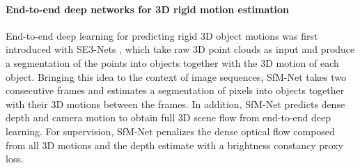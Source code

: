 \paragraph{End-to-end deep networks for 3D rigid motion estimation}
End-to-end deep learning for predicting rigid 3D object motions was first introduced with
SE3-Nets \cite{SE3Nets}, which take raw 3D point clouds as input and produce a segmentation
of the points into objects together with the 3D motion of each object.
Bringing this idea to the context of image sequences, SfM-Net \cite{SfmNet} takes two consecutive frames and
estimates a segmentation of pixels into objects together with their 3D motions between the frames.
In addition, SfM-Net predicts dense depth and camera motion to obtain full 3D scene flow from end-to-end deep learning.
For supervision, SfM-Net penalizes the dense optical flow composed from all 3D motions and the depth estimate
with a brightness constancy proxy loss.
